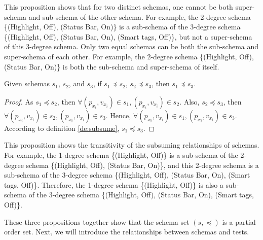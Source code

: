 This proposition shows that for two distinct schemas, one cannot be both super-schema and sub-schema of the other schema. For example, the 2-degree schema \{(Highlight, Off), (Status Bar, On)\} is a sub-schema of the 3-degree schema \{(Highlight, Off), (Status Bar, On), (Smart tags, Off)\}, but not a super-schema of this 3-degree schema.  Only two equal schemas can be both the sub-schema and super-schema of each other. For example, the 2-degree schema \{(Highlight, Off), (Status Bar, On)\} is both the sub-schema and super-schema of itself.

\begin{proposition}[Transitive]\label{pro:subsumetrans}
Given schemas $s_{1}$, $s_{2}$, and $s_{3}$, if $s_{1} \preceq s_{2}$, $s_{2} \preceq s_{3}$, then $s_{1} \preceq s_{3}$.
\end{proposition}

\begin{proof}
As $s_{1} \preceq s_{2}$, then $\forall (p_{x_{i}}, v_{x_{i}})\in s_{1}, (p_{x_{i}}, v_{x_{i}}) \in s_{2}$. Also, $s_{2} \preceq s_{3}$, then $\forall (p_{x_{i}}, v_{x_{i}})\in s_{2}, (p_{x_{i}}, v_{x_{i}}) \in s_{3}$. Hence, $\forall (p_{x_{i}}, v_{x_{i}})\in s_{1}, (p_{x_{i}}, v_{x_{i}}) \in s_{3}$. According to definition \ref{de:subsume}, $s_{1} \preceq s_{3}$.
\end{proof}

This proposition shows the transitivity of the subsuming relationships of schemas. For example, the 1-degree schema \{(Highlight, Off)\} is a sub-schema of the 2-degree schema \{(Highlight, Off), (Status Bar, On)\}, and this 2-degree schema is a sub-schema of the 3-degree schema \{(Highlight, Off), (Status Bar, On), (Smart tags, Off)\}. Therefore, the 1-degree schema \{(Highlight, Off)\} is also a sub-schema of the 3-degree schema \{(Highlight, Off), (Status Bar, On), (Smart tags, Off)\}. 


These three propositions together show that the schema set $(s, \preceq)$ is a partial order set. Next, we will introduce the relationships between schemas and tests.

\begin{definition}\label{de:containorhit}

\end{definition}


\begin{definition} \label{de:alltests}

\end{definition}


